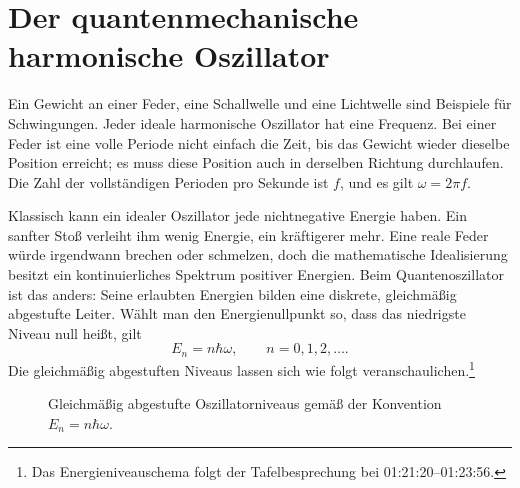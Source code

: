 \begin{classroomqa}\end{classroomqa}

\section{Der quantenmechanische harmonische Oszillator}

Ein Gewicht an einer Feder, eine Schallwelle und eine Lichtwelle sind Beispiele für Schwingungen. Jeder ideale harmonische Oszillator hat eine Frequenz. Bei einer Feder ist eine volle Periode nicht einfach die Zeit, bis das Gewicht wieder dieselbe Position erreicht; es muss diese Position auch in derselben Richtung durchlaufen. Die Zahl der vollständigen Perioden pro Sekunde ist \(f\), und es gilt \(\omega=2\pi f\).

Klassisch kann ein idealer Oszillator jede nichtnegative Energie haben. Ein sanfter Stoß verleiht ihm wenig Energie, ein kräftigerer mehr. Eine reale Feder würde irgendwann brechen oder schmelzen, doch die mathematische Idealisierung besitzt ein kontinuierliches Spektrum positiver Energien. Beim Quantenoszillator ist das anders: Seine erlaubten Energien bilden eine diskrete, gleichmäßig abgestufte Leiter. Wählt man den Energienullpunkt so, dass das niedrigste Niveau null heißt, gilt
\begin{equation}
E_n=n\hbar\omega,
\qquad n=0,1,2,\ldots .
\end{equation}
Die gleichmäßig abgestuften Niveaus lassen sich wie folgt veranschaulichen.\footnote{Das Energieniveauschema folgt der Tafelbesprechung bei 01:21:20--01:23:56.}

\begin{figure}[t]\centering
{}\caption{Gleichmäßig abgestufte Oszillatorniveaus gemäß der Konvention \(E_n=n\hbar\omega\).}\end{figure}

